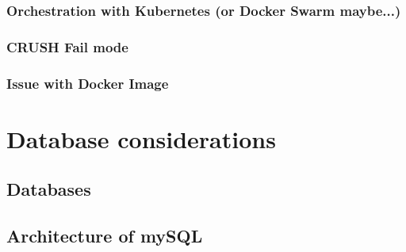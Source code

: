 \documentclass[titlepage, a4paper, 11pt]{scrartcl}
\begin{document}
            \subsubsection{Orchestration with Kubernetes (or Docker Swarm maybe...)}


            \subsubsection{CRUSH Fail mode}\label{system:crush-fail}




            \subsubsection{Issue with Docker Image}



        
    \section{Database considerations}

        \subsection{Databases}


        \subsection{Architecture of mySQL}

\end{document}
